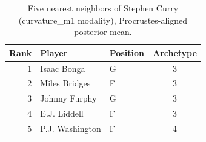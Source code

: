 \begin{table}[htbp]
  \centering\small
  \begin{tabular}{rllc}
    \toprule
    Rank & Player & Position & Archetype \\
    \midrule
    1 & Isaac Bonga & G & 3 \\
    2 & Miles Bridges & F & 3 \\
    3 & Johnny Furphy & G & 3 \\
    4 & E.J. Liddell & F & 3 \\
    5 & P.J. Washington & F & 4 \\
    \bottomrule
  \end{tabular}
  \caption{Five nearest neighbors of Stephen Curry (curvature_m1 modality), Procrustes-aligned posterior mean.}
  \label{tab:Stephen_Curry_neighbors_curvature_m1}
\end{table}

